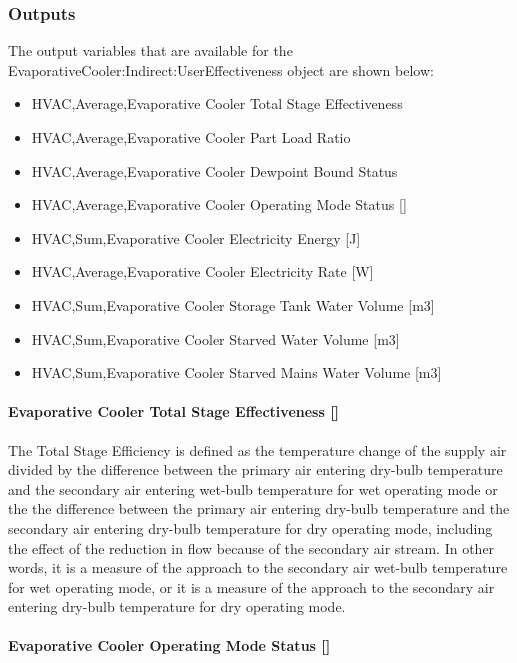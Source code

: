 \subsubsection{Outputs}\label{outputs-4-004}

The output variables that are available for the EvaporativeCooler:Indirect:UserEffectiveness object are shown below:

\begin{itemize}
\item
  HVAC,Average,Evaporative Cooler Total Stage Effectiveness
\item
  HVAC,Average,Evaporative Cooler Part Load Ratio
\item
  HVAC,Average,Evaporative Cooler Dewpoint Bound Status
\item
  HVAC,Average,Evaporative Cooler Operating Mode Status {[]}
\item
  HVAC,Sum,Evaporative Cooler Electricity Energy {[}J{]}
\item
  HVAC,Average,Evaporative Cooler Electricity Rate {[}W{]}
\item
  HVAC,Sum,Evaporative Cooler Storage Tank Water Volume {[}m3{]}
\item
  HVAC,Sum,Evaporative Cooler Starved Water Volume {[}m3{]}
\item
  HVAC,Sum,Evaporative Cooler Starved Mains Water Volume {[}m3{]}
\end{itemize}

\paragraph{Evaporative Cooler Total Stage Effectiveness {[]}}\label{evaporative-cooler-total-stage-effectiveness-2}

The Total Stage Efficiency is defined as the temperature change of the supply air divided by the difference between the primary air entering dry-bulb temperature and the secondary air entering wet-bulb temperature for wet operating mode or the the difference between the primary air entering dry-bulb temperature and the secondary air entering dry-bulb temperature for dry operating mode, including the effect of the reduction in flow because of the secondary air stream. In other words, it is a measure of the approach to the secondary air wet-bulb temperature for wet operating mode, or it is a measure of the approach to the secondary air entering dry-bulb temperature for dry operating mode.

\paragraph{Evaporative Cooler Operating Mode Status {[]}}\label{evaporative-cooler-operating-mode-status}

